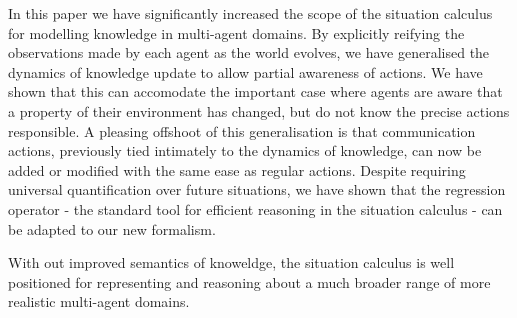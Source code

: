 \documentclass[letterpaper]{article}
\begin{document}
In this paper we have significantly increased the scope of the situation
calculus for modelling knowledge in multi-agent domains. By explicitly
reifying the observations made by each agent as the world evolves,
we have generalised the dynamics of knowledge update to allow partial
awareness of actions. We have shown that this can accomodate the important
case where agents are aware that a property of their environment has
changed, but do not know the precise actions responsible. A pleasing
offshoot of this generalisation is that communication actions, previously
tied intimately to the dynamics of knowledge, can now be added or
modified with the same ease as regular actions. Despite requiring
universal quantification over future situations, we have shown that
the regression operator - the standard tool for efficient reasoning
in the situation calculus - can be adapted to our new formalism.

With out improved semantics of knoweldge, the situation calculus is
well positioned for representing and reasoning about a much broader
range of more realistic multi-agent domains.



\end{document}
